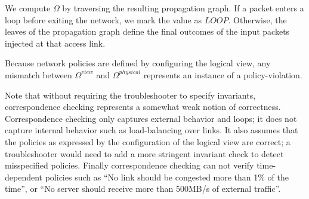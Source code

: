 We compute $\Omega$ by traversing the resulting propagation graph. If a packet
enters a loop before exiting the network, we mark the value as
$LOOP$. Otherwise,
the leaves of the propagation graph define the final outcomes of the input
packets injected at that access link.

Because network policies are defined by
configuring the logical view, any mismatch between $\Omega^{view}$ and $\Omega^{physical}$
represents an instance of a policy-violation.

Note that without requiring the troubleshooter to specify invariants,
correspondence checking represents a somewhat weak notion of
correctness. Correspondence checking only captures external behavior and
loops; it does not capture internal behavior such as load-balancing
over links. It also assumes that the policies as expressed by the
configuration of the logical view are correct; a troubleshooter would need to add a more
stringent invariant check to detect misspecified policies.
Finally correspondence checking can not verify
time-dependent policies such as ``No link should be congested more than 1\% of
the time'', or ``No server should receive more than 500MB/s of external traffic''.

%
%
%
%
%
%





